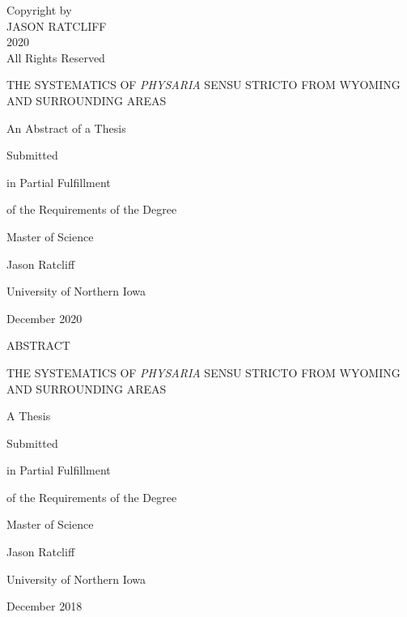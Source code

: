 \thispagestyle{empty}
\vspace*{\fill}         %
\begin{center}          
  Copyright by\\
  JASON RATCLIFF\\
  2020\\
  All Rights Reserved
\end{center}
\vspace*{\fill}
\clearpage

\clearpage
\thispagestyle{empty}
\begin{center} 
THE SYSTEMATICS OF \textit{PHYSARIA} SENSU STRICTO FROM WYOMING 
AND SURROUNDING AREAS
\end{center}
\vspace{120pt}
\begin{center}
  An Abstract of a Thesis

  Submitted

  in Partial Fulfillment

  of the Requirements of the Degree
  
  Master of Science
\end{center}
\vspace{120pt}
\begin{center}
  Jason Ratcliff
  
  University of Northern Iowa
  
  December 2020
\end{center}
\clearpage

\thispagestyle{empty}
\begin{center}
ABSTRACT
\end{center}
\clearpage

\clearpage
\thispagestyle{empty}
\begin{center} 
THE SYSTEMATICS OF \textit{PHYSARIA} SENSU STRICTO FROM WYOMING 
AND SURROUNDING AREAS
\end{center}
\vspace{120pt}
\begin{center}
  A Thesis

  Submitted

  in Partial Fulfillment

  of the Requirements of the Degree
  
  Master of Science
\end{center}
\vspace{120pt}
\begin{center}
  Jason Ratcliff
  
  University of Northern Iowa
  
  December 2018
\end{center}

